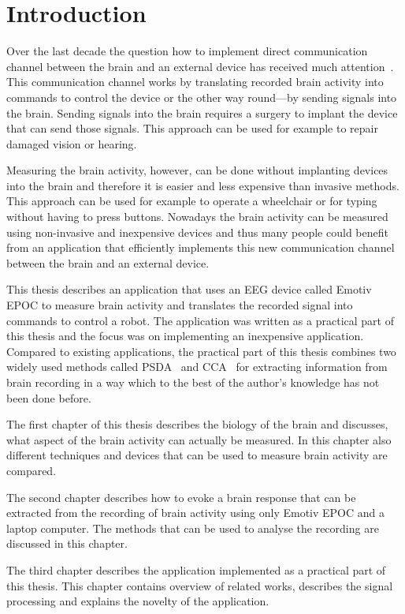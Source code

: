 
\chapter*{Introduction}

Over the last decade the question how to implement direct communication channel between the brain and an external device has received much attention~\cite{mec, cca_lin, MPCC, sc, LRT, LASSO}. This communication channel works by translating recorded brain activity into commands to control the device or the other way round---by sending signals into the brain. Sending signals into the brain requires a surgery to implant the device that can send those signals. This approach can be used for example to repair damaged vision or hearing.

Measuring the brain activity, however, can be done without implanting devices into the brain and therefore it is easier and less expensive than invasive methods. This approach can be used for example to operate a wheelchair or for typing without having to press buttons. Nowadays the brain activity can be measured using non-invasive and inexpensive devices and thus many people could benefit from an application that efficiently implements this new communication channel between the brain and an external device.

This thesis describes an application that uses an \gls{EEG} device called Emotiv EPOC to measure brain activity and translates the recorded signal into commands to control a robot. The application was written as a practical part of this thesis and the focus was on implementing an inexpensive application. Compared to existing applications, the practical part of this thesis combines two widely used methods called \gls{PSDA}~\cite{psda} and \gls{CCA}~\cite{cca_lin} for extracting information from brain recording in a way which to the best of the author's knowledge has not been done before.

The first chapter of this thesis describes the biology of the brain and discusses, what aspect of the brain activity can actually be measured. In this chapter also different techniques and devices that can be used to measure brain activity are compared.

The second chapter describes how to evoke a brain response that can be extracted from the recording of brain activity using only Emotiv EPOC and a laptop computer. The methods that can be used to analyse the recording are discussed in this chapter.

The third chapter describes the application implemented as a practical part of this thesis. This chapter contains overview of related works, describes the signal processing and explains the novelty of the application.
